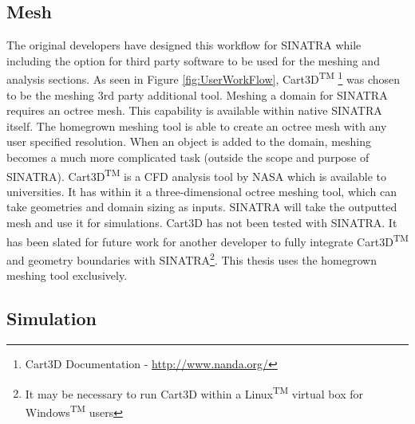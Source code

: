\subsection{Mesh}
The original developers have designed this workflow for SINATRA while including the option for third party software to be used for the meshing and analysis sections. As seen in Figure \ref{fig:UserWorkFlow}, Cart3D\textsuperscript{TM} \footnote{Cart3D Documentation - \url{http://www.nanda.org/}} was chosen to be the meshing 3rd party additional tool. Meshing a domain for SINATRA requires an octree mesh. This capability is available within native SINATRA itself. The homegrown meshing tool is able to create an octree mesh with any user specified resolution. When an object is added to the domain, meshing becomes a much more complicated task (outside the scope and purpose of SINATRA). Cart3D\textsuperscript{TM} is a CFD analysis tool by NASA which is available to universities. It has within it a three-dimensional octree meshing tool, which can take geometries and domain sizing as inputs. SINATRA will take the outputted mesh and use it for simulations. Cart3D has not been tested with SINATRA. It has been slated for future work for another developer to fully integrate Cart3D\textsuperscript{TM} and geometry boundaries with SINATRA\footnote{It may be necessary to run Cart3D within a Linux\textsuperscript{TM} virtual box for Windows\textsuperscript{TM} users}. This thesis uses the homegrown meshing tool exclusively. \par

\subsection{Simulation}

